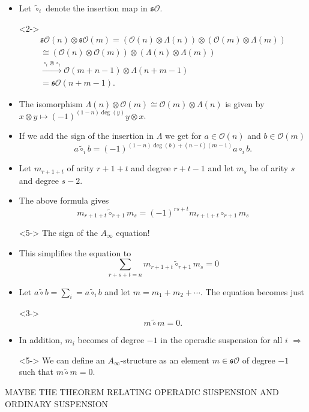 \documentclass{beamer}
\theoremstyle{definition}
\begin{document}
\begin{frame}
\begin{itemize}
\item<1-> Let $\tilde{\circ}_i$ denote the insertion map in $\mathfrak{s}\mathcal{O}$.
\item[]<2-> \begin{align*}
\mathfrak{s}\mathcal{O}(n)\otimes\mathfrak{s}\mathcal{O}(m)=(\mathcal{O}(n)\otimes\Lambda(n))\otimes (\mathcal{O}(m)\otimes\Lambda(m))\\
\cong (\mathcal{O}(n)\otimes \mathcal{O}(m))\otimes (\Lambda(n)\otimes \Lambda(m))\\
\xrightarrow{\circ_i\otimes\circ_i} \mathcal{O}(m+n-1)\otimes \Lambda(n+m-1)\\=\mathfrak{s}\mathcal{O}(n+m-1).
\end{align*}
\end{itemize}
\end{frame}
\begin{frame}
\begin{itemize}
\item<1-> The isomorphism $\Lambda(n)\otimes \mathcal{O}(m)\cong \mathcal{O}(m)\otimes \Lambda(n)$ is given by $x\otimes y\mapsto (-1)^{(1-n)\deg(y)}y\otimes x$.
\item<2-> If we add the sign of the insertion in $\Lambda$ we get for $a\in\mathcal{O}(n)$ and $b\in\mathcal{O}(m)$
\[a\tilde{\circ}_ib=(-1)^{(1-n)\deg(b)+(n-i)(m-1)}a\circ_i b.\]
\item<3-> Let $m_{r+1+t}$ of arity $r+1+t$ and degree $r+t-1$ and let $m_s$ be of arity $s$ and degree $s-2$. %
\item<4-> The above formula gives 
\[m_{r+1+t}\tilde{\circ}_{r+1}m_s=(-1)^{rs+t}m_{r+1+t}\circ_{r+1}m_s\]
\item[]<5-> The sign of the $A_\infty$ equation!
\end{itemize}
\end{frame}

\begin{frame}
\begin{itemize}
\item<1-> This simplifies the equation to
\[\sum_{r+s+t=n}m_{r+1+t}\tilde{\circ}_{r+1}m_s=0\] %
\item<2-> Let $a\tilde{\circ}b=\sum_{i}=a\tilde{\circ}_ib$ and let $m=m_1+m_2+\cdots$. The equation becomes just
\item[]<3-> \[m\tilde{\circ}m=0.\]
\item<4-> In addition, $m_i$ becomes of degree $-1$ in the operadic suspension for all $i$ $\Rightarrow$
\item[]<5-> We can define an $A_\infty$-structure as an element $m\in\mathfrak{s}\mathcal{O}$ of degree $-1$ such that $m\tilde{\circ}m=0$. 
\end{itemize}
\end{frame}
\begin{frame}
MAYBE THE THEOREM RELATING OPERADIC SUSPENSION AND ORDINARY SUSPENSION
\end{frame}
\end{document}
